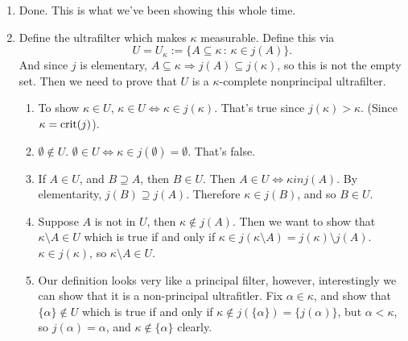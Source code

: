\documentclass{article}
\begin{document}
\begin{enumerate}
    \item[(i) $\Rightarrow$ (ii)] Done. This is what we've been showing this whole time.
    \item[(ii) $\Rightarrow$ (i)] Define the ultrafilter which makes $\kappa$ measurable. Define this via \[ U = U_{\kappa} := \{ A \subseteq \kappa \, : \, \kappa \in j(A)\}.\] And since $j$ is elementary, $A \subseteq \kappa \Rightarrow j(A) \subseteq j(\kappa)$, so this is not the empty set. \gap 
    Then we need to prove that $U$ is a $\kappa$-complete nonprincipal ultrafilter.
    \begin{enumerate}
        \item To show $\kappa \in U$, $\kappa \in U \Leftrightarrow \kappa \in j(\kappa)$. That's true since $j(\kappa) >\kappa$. (Since $\kappa = \operatorname{crit}(j)$).
        \item $\emptyset \notin U$. $\emptyset \in U \Leftrightarrow \kappa \in j(\emptyset)= \emptyset$. That's false.
        \item If $A \in U$, and $B \supseteq A$, then $B \in U$. Then $A \in U \Leftrightarrow \kappa in j(A)$. By elementarity, $j(B) \supseteq j(A)$. Therefore $\kappa \in j(B)$, and so $B \in U$.
        \item Suppose $A$ is not in $U$, then $\kappa \notin j(A)$. Then we want to show that $\kappa \setminus A \in U$ which is true if and only if $\kappa \in j(\kappa \setminus A) = j(\kappa) \setminus j(A)$. $\kappa \in j(\kappa)$, so $\kappa \setminus A \in U$.
        \item Our definition looks very like a principal filter, however, interestingly we can show that it is a non-principal ultrafitler. Fix $\alpha \in \kappa$, and show that $\{\alpha\} \notin U$ which is true if and only if $\kappa \notin j(\{\alpha\}) = \{j(\alpha)\}$, but $\alpha < \kappa$, so $j(\alpha)=\alpha$, and $\kappa \notin \{\alpha\}$ clearly.
        

\end{enumerate}
\end{enumerate}
\end{document}
